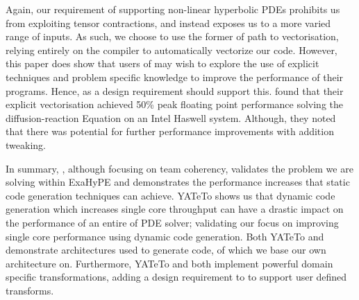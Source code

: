 Again, our requirement of supporting non-linear hyperbolic PDEs prohibits us from exploiting tensor contractions, and instead exposes us to a more varied range of inputs.
As such, we choose to use the former of  \citeauthor{codegen_dg_SIMD} path to vectorisation, relying entirely on the compiler to automatically vectorize our code.
However, this paper does show that users of \phlat may wish to explore the use of explicit techniques and problem specific knowledge to improve the performance of their programs.
Hence, as a design requirement \phlat should support this.
\citeauthor{codegen_dg_SIMD} found that their explicit vectorisation achieved 50\% peak floating point performance solving the diffusion-reaction Equation on an Intel Haswell system.
Although, they noted that there was potential for further performance improvements with addition tweaking.

In summary, \citeauthor{templateExahype}, although focusing on team coherency, validates the problem we are solving within ExaHyPE and demonstrates the performance increases that static code generation techniques can achieve.
YATeTo shows us that dynamic code generation which increases single core throughput can have a drastic impact on the performance of an entire of PDE solver; validating our focus on improving single core performance using dynamic code generation.
Both YATeTo and \citeauthor{codegen_dg_SIMD} demonstrate architectures used to generate code, of which we base our own architecture on.
Furthermore, YATeTo and \citeauthor{codegen_dg_SIMD} both implement powerful domain specific transformations, adding a design requirement to \phlat to support user defined transforms.  
